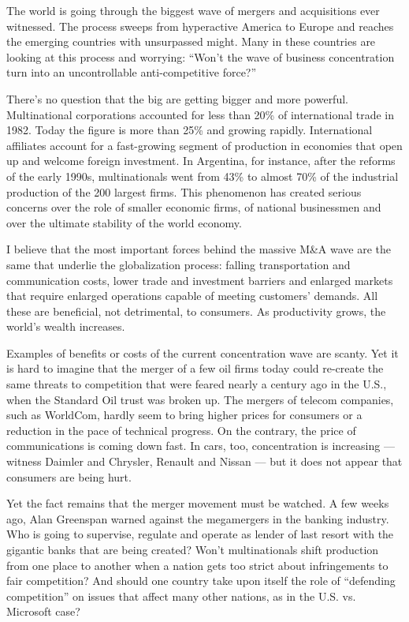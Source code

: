 \documentclass[UTF8,11pt]{ctexart}
\begin{document}
The world is going through the biggest wave of mergers and acquisitions ever witnessed. The process sweeps from hyperactive America to Europe and reaches the emerging countries with unsurpassed might. Many in these countries are looking at this process and worrying: “Won’t the wave of business concentration turn into an uncontrollable anti-competitive force?”


There’s no question that the big are getting bigger and more powerful. Multinational corporations accounted for less than 20\% of international trade in 1982. Today the figure is more than 25\% and growing rapidly. International affiliates account for a fast-growing segment of production in economies that open up and welcome foreign investment. In Argentina, for instance, after the reforms of the early 1990s, multinationals went from 43\% to almost 70\% of the industrial production of the 200 largest firms. This phenomenon has created serious concerns over the role of smaller economic firms, of national businessmen and over the ultimate stability of the world economy.


I believe that the most important forces behind the massive M\&A wave are the same that underlie the globalization process: falling transportation and communication costs, lower trade and investment barriers and enlarged markets that require enlarged operations capable of meeting customers’ demands. All these are beneficial, not detrimental, to consumers. As productivity grows, the world’s wealth increases.


Examples of benefits or costs of the current concentration wave are scanty. Yet it is hard to imagine that the merger of a few oil firms today could re-create the same threats to competition that were feared nearly a century ago in the U.S., when the Standard Oil trust was broken up. The mergers of telecom companies, such as WorldCom, hardly seem to bring higher prices for consumers or a reduction in the pace of technical progress. On the contrary, the price of communications is coming down fast. In cars, too, concentration is increasing — witness Daimler and Chrysler, Renault and Nissan — but it does not appear that consumers are being hurt.


Yet the fact remains that the merger movement must be watched. A few weeks ago, Alan Greenspan warned against the megamergers in the banking industry. Who is going to supervise, regulate and operate as lender of last resort with the gigantic banks that are being created? Won’t multinationals shift production from one place to another when a nation gets too strict about infringements to fair competition? And should one country take upon itself the role of “defending competition” on issues that affect many other nations, as in the U.S. vs. Microsoft case?
\end{document}
